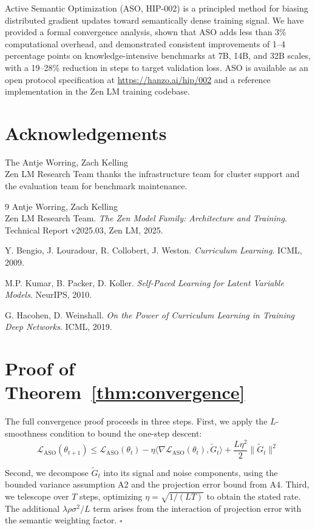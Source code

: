 \documentclass[11pt,a4paper]{article}
\begin{document}
Active Semantic Optimization (ASO, HIP-002) is a principled method for biasing
distributed gradient updates toward semantically dense training signal. We have provided
a formal convergence analysis, shown that ASO adds less than 3\% computational overhead,
and demonstrated consistent improvements of 1--4 percentage points on knowledge-intensive
benchmarks at 7B, 14B, and 32B scales, with a 19--28\% reduction in steps to target
validation loss. ASO is available as an open protocol specification at
\url{https://hanzo.ai/hip/002} and a reference implementation in the Zen LM training
codebase.

\section*{Acknowledgements}
The Antje Worring, Zach Kelling \\ Zen LM Research Team thanks the infrastructure team for cluster support and the
evaluation team for benchmark maintenance.

\begin{thebibliography}{9}
Antje Worring, Zach Kelling \\ Zen LM Research Team.
\textit{The Zen Model Family: Architecture and Training}.
Technical Report v2025.03, Zen LM, 2025.

Y. Bengio, J. Louradour, R. Collobert, J. Weston.
\textit{Curriculum Learning}.
ICML, 2009.

M.P. Kumar, B. Packer, D. Koller.
\textit{Self-Paced Learning for Latent Variable Models}.
NeurIPS, 2010.

G. Hacohen, D. Weinshall.
\textit{On the Power of Curriculum Learning in Training Deep Networks}.
ICML, 2019.
\end{thebibliography}

\appendix
\section{Proof of Theorem~\ref{thm:convergence}}

The full convergence proof proceeds in three steps. First, we apply the $L$-smoothness
condition to bound the one-step descent:
\begin{equation}
    \mathcal{L}_{\text{ASO}}(\theta_{t+1}) \leq
    \mathcal{L}_{\text{ASO}}(\theta_t)
    - \eta \langle \nabla \mathcal{L}_{\text{ASO}}(\theta_t), \tilde{G}_t \rangle
    + \frac{L\eta^2}{2}\|\tilde{G}_t\|^2
\end{equation}

Second, we decompose $\tilde{G}_t$ into its signal and noise components, using the
bounded variance assumption A2 and the projection error bound from A4. Third, we
telescope over $T$ steps, optimizing $\eta = \sqrt{1/(LT)}$ to obtain the stated rate.
The additional $\lambda \rho \sigma^2 / L$ term arises from the interaction of
projection error with the semantic weighting factor. $\square$
\end{document}
